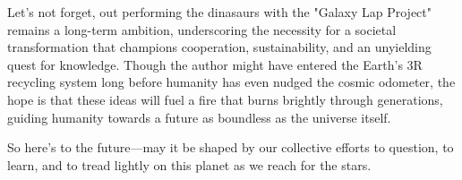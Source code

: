 \documentclass[12pt]{article}
\begin{document}
Let's not forget, out performing the dinasaurs with the "Galaxy Lap Project" remains a long-term ambition, underscoring the necessity for a societal transformation that champions cooperation, sustainability, and an unyielding quest for knowledge. Though the author might have entered the Earth's 3R recycling system long before humanity has even nudged the cosmic odometer, the hope is that these ideas will fuel a fire that burns brightly through generations, guiding humanity towards a future as boundless as the universe itself.

So here's to the future—may it be shaped by our collective efforts to question, to learn, and to tread lightly on this planet as we reach for the stars.
\end{document}
